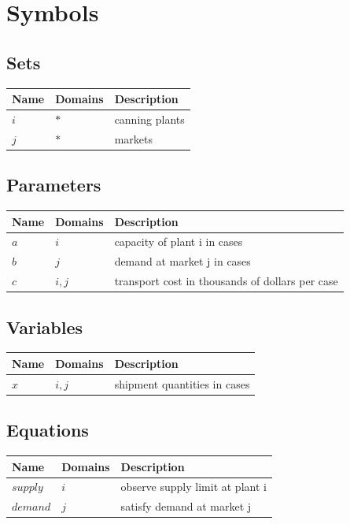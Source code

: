 \documentclass[11pt]{article}
\begin{document}
\section*{Symbols}


\subsection*{Sets}
\begin{tabularx}{\textwidth}{| l | l | X |}
\hline
\textbf{Name} & \textbf{Domains} & \textbf{Description}\\
\hline
\endhead

$i$ & $*$ & canning plants\\
$j$ & $*$ & markets\\
\hline
\end{tabularx}
\subsection*{Parameters}
\begin{tabularx}{\textwidth}{| l | l | X |}
\hline
\textbf{Name} & \textbf{Domains} & \textbf{Description}\\
\hline
\endhead

$a$ & $i$ & capacity of plant i in cases\\
$b$ & $j$ & demand at market j in cases\\
$c$ & $i,j$ & transport cost in thousands of dollars per case\\
\hline
\end{tabularx}
\subsection*{Variables}
\begin{tabularx}{\textwidth}{| l | l | X |}
\hline
\textbf{Name} & \textbf{Domains} & \textbf{Description}\\
\hline
\endhead

$x$ & $i,j$ & shipment quantities in cases\\
\hline
\end{tabularx}
\subsection*{Equations}
\begin{tabularx}{\textwidth}{| l | l | X |}
\hline
\textbf{Name} & \textbf{Domains} & \textbf{Description}\\
\hline
\endhead

$supply$ & $i$ & observe supply limit at plant i\\
$demand$ & $j$ & satisfy demand at market j\\
\hline
\end{tabularx}
\end{document}
